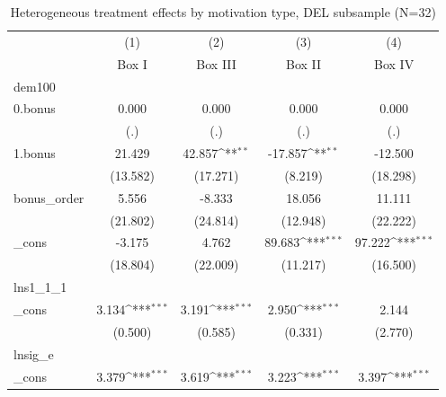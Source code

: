 \begin{table}[htbp]\centering
\def\sym#1{\ifmmode^{#1}\else\(^{#1}\)\fi}
\caption{Heterogeneous treatment effects by motivation type, DEL subsample (N=32)}
\begin{tabular}{l*{4}{c}}
\toprule
            &\multicolumn{1}{c}{(1)}&\multicolumn{1}{c}{(2)}&\multicolumn{1}{c}{(3)}&\multicolumn{1}{c}{(4)}\\
            &\multicolumn{1}{c}{Box I}&\multicolumn{1}{c}{Box III}&\multicolumn{1}{c}{Box II}&\multicolumn{1}{c}{Box IV}\\
\midrule
dem100      &                     &                     &                     &                     \\
0.bonus     &       0.000         &       0.000         &       0.000         &       0.000         \\
            &         (.)         &         (.)         &         (.)         &         (.)         \\
\addlinespace
1.bonus     &      21.429         &      42.857\sym{**} &     -17.857\sym{**} &     -12.500         \\
            &    (13.582)         &    (17.271)         &     (8.219)         &    (18.298)         \\
\addlinespace
bonus\_order &       5.556         &      -8.333         &      18.056         &      11.111         \\
            &    (21.802)         &    (24.814)         &    (12.948)         &    (22.222)         \\
\addlinespace
\_cons      &      -3.175         &       4.762         &      89.683\sym{***}&      97.222\sym{***}\\
            &    (18.804)         &    (22.009)         &    (11.217)         &    (16.500)         \\
\midrule
lns1\_1\_1    &                     &                     &                     &                     \\
\_cons      &       3.134\sym{***}&       3.191\sym{***}&       2.950\sym{***}&       2.144         \\
            &     (0.500)         &     (0.585)         &     (0.331)         &     (2.770)         \\
\midrule
lnsig\_e     &                     &                     &                     &                     \\
\_cons      &       3.379\sym{***}&       3.619\sym{***}&       3.223\sym{***}&       3.397\sym{***}\\

\end{tabular}
\end{table}

